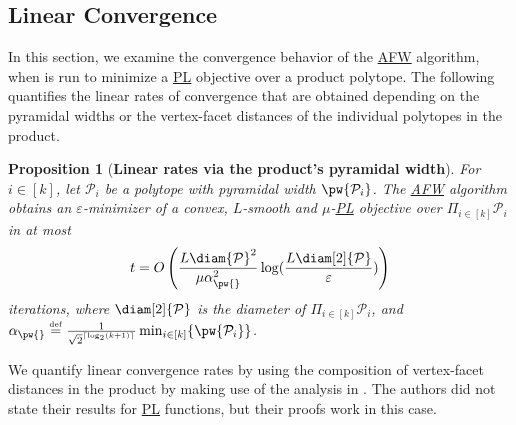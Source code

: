 \documentclass{article}
\newcommand\linktoproof[1]{{\normalfont[{\hyperlink{proof:#1}{$\downarrow$}}]}}
\newcommand{\bigol}[1]{O\left( #1 \right)}
\newcommand{\mP}{\mathcal{P}}
\DeclarePairedDelimiter\ceil{\lceil}{\rceil}
\newcommand{\defi}{\stackrel{\mathrm{\scriptscriptstyle def}}{=}}
\newtheorem{proposition}[theorem]{Proposition}
\let\epsilon\varepsilon
\newif\ifTODO
\newcommand{\dav}[1]{\ifTODO \todo[size=\scriptsize, color=yellow]{DM: #1}{} \fi}
\newcommand\newlink[2]{\hyperlink{#1}{\normalcolor #2}}
\newcommand{\PL}{\newlink{def:acronym_polyak_lojasiewicz}{PL}}
\newcommand{\AFW}{\newlink{def:acronym_away_frank_wolfe}{AFW}}
\begin{document}
\subsection{Linear Convergence}\label{s:convergence}

In this section, we examine the convergence behavior of the \AFW{} algorithm, when is run to minimize a \PL{} objective over a product polytope.
The following quantifies the linear rates of convergence that are obtained depending on the pyramidal widths or the vertex-facet distances of the individual polytopes in the product.

\begin{proposition}[\textbf{Linear rates via the product's pyramidal width}]
\label{prop:linconv_pw}\linktoproof{prop:linconv_pw}
For $i\in[k]$, let $\mP_i$ be a polytope with pyramidal width $\pw{\mP_i}$.
The \AFW{} algorithm obtains an $\epsilon$-minimizer of a convex, $L$-smooth and $\mu$-\PL{} objective over $\Pi_{i \in [k]}\mP_i$ in at most
    \vspace{0.2cm}
\[
t= \bigol{\frac{L\diam{\mP}^2}{\mu \alpha_{\pw{}}^2} \log(\frac{L\diam[2]{\mP}}{\epsilon})}
    \vspace{0.3cm}
\]
iterations, where $\diam[2]{\mP}$ is the diameter of $\Pi_{i \in [k]}\mP_i$, and $\alpha_{\pw{}} \defi \frac{1}{\sqrt{2}^{\ceil{\log_2 (k+1)}}}\min_{i \in [k]} \{\pw{\mP_i}\}$.
%
\end{proposition}


We quantify linear convergence rates by using the composition of vertex-facet distances in the product by making use of the analysis in \cite{BS15}. The authors did not state their results for \PL{} functions, but their proofs work in this case.
\end{document}
